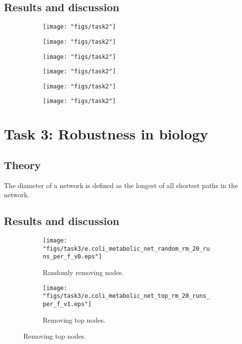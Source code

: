 \documentclass{article}
\begin{document}
\subsection{Results and discussion}

\begin{figure}[H]
	\centering
	\begin{subfigure}[b]{.3\textwidth}
		\centering
		\texttt{[image: "figs/task2"]}
		\caption{}
		\label{fig:task2}
	\end{subfigure}
	\begin{subfigure}[b]{.3\textwidth}
		\centering
		\texttt{[image: "figs/task2"]}
		\caption{}
		\label{fig:task2}
	\end{subfigure}
	\begin{subfigure}[b]{.3\textwidth}
		\centering
		\texttt{[image: "figs/task2"]}
		\caption{}
		\label{fig:task2}
	\end{subfigure}
	\begin{subfigure}[b]{.3\textwidth}
		\centering
		\texttt{[image: "figs/task2"]}
		\caption{}
		\label{fig:task2}
	\end{subfigure}
	\begin{subfigure}[b]{.3\textwidth}
		\centering
		\texttt{[image: "figs/task2"]}
		\caption{}
		\label{fig:task2}
	\end{subfigure}
	\begin{subfigure}[b]{.3\textwidth}
		\centering
		\texttt{[image: "figs/task2"]}
		\caption{}
		\label{fig:task2}
	\end{subfigure}
\end{figure}



\section{Task 3: Robustness in biology}
\subsection{Theory}
The diameter of a network is defined as the longest of all shortest paths in the network. 
\subsection{Results and discussion}

\begin{figure}[H]
	\centering
	\begin{subfigure}[b]{.49\textwidth}
		\centering
		\texttt{[image: "figs/task3/e.coli\_metabolic\_net\_random\_rm\_20\_runs\_per\_f\_v0.eps"]}
		\caption{Randomly removing nodes.}
		\label{fig:task3_rand}
	\end{subfigure}
	\begin{subfigure}[b]{.49\textwidth}
		\centering
		\texttt{[image: "figs/task3/e.coli\_metabolic\_net\_top\_rm\_20\_runs\_per\_f\_v1.eps"]}
		\caption{Removing top nodes.}
		\label{fig:task3_top}
	\end{subfigure}
\end{figure}
\end{document}
